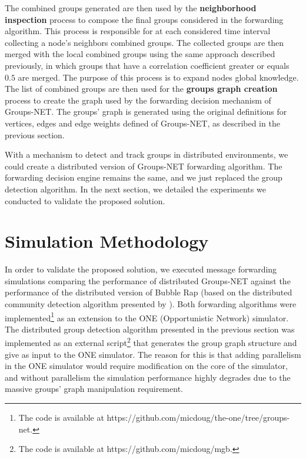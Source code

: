 The combined groups generated are then used by the \textbf{neighborhood inspection} process to compose the final groups considered in the forwarding algorithm. This process is responsible for at each considered time interval collecting a node's neighbors combined groups. The collected groups are then merged with the local combined groups using the same approach described previously, in which groups that have a correlation coefficient greater or equals $0.5$ are merged. The purpose of this process is to expand nodes global knowledge. The list of combined groups are then used for the \textbf{groups graph creation} process to create the graph used by the forwarding decision mechanism of Groups-NET. The groups' graph is generated using the original definitions for vertices, edges and edge weights defined of Groups-NET, as described in the previous section.

With a mechanism to detect and track groups in distributed environments, we could create a distributed version of Groups-NET forwarding algorithm. The forwarding decision engine remains the same, and we just replaced the group detection algorithm. In the next section, we detailed the experiments we conducted to validate the proposed solution.

\section{Simulation Methodology}
\label{sec:GNExperiments}

In order to validate the proposed solution, we executed message forwarding simulations comparing the performance of distributed Groups-NET against the performance of the distributed version of Bubble Rap \citep{hui2011bubble} (based on the distributed community detection algorithm presented by \citet{hui2007distributed}). Both forwarding algorithms were implemented\footnote{The code is available at https://github.com/micdoug/the-one/tree/groups-net.} as an extension to the ONE (Opportunistic Network) simulator. The distributed group detection algorithm presented in the previous section was implemented as an external script\footnote{The code is available at https://github.com/micdoug/mgb.} that generates the group graph structure and give as input to the ONE simulator. The reason for this is that adding parallelism in the ONE simulator would require modification on the core of the simulator, and without parallelism the simulation performance highly degrades due to the massive groups' graph manipulation requirement.


